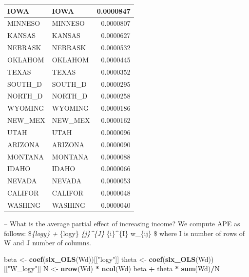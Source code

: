 \documentclass[
  a4paper,
]{article}
\newenvironment{Shaded}{\begin{snugshade}}{\end{snugshade}}
\newcommand{\FunctionTok}[1]{\textcolor[rgb]{0.13,0.29,0.53}{\textbf{#1}}}
\newcommand{\NormalTok}[1]{#1}
\newcommand{\OtherTok}[1]{\textcolor[rgb]{0.56,0.35,0.01}{#1}}
\newcommand{\SpecialCharTok}[1]{\textcolor[rgb]{0.81,0.36,0.00}{\textbf{#1}}}
\newcommand{\StringTok}[1]{\textcolor[rgb]{0.31,0.60,0.02}{#1}}
\begin{document}
\begin{table}
\begin{tabular}[t]{l|l|r}
\hline
IOWA & IOWA & 0.0000847\\
\hline
MINNESO & MINNESO & 0.0000807\\
\hline
KANSAS & KANSAS & 0.0000627\\
\hline
NEBRASK & NEBRASK & 0.0000532\\
\hline
OKLAHOM & OKLAHOM & 0.0000445\\
\hline
TEXAS & TEXAS & 0.0000352\\
\hline
SOUTH\_D & SOUTH\_D & 0.0000295\\
\hline
NORTH\_D & NORTH\_D & 0.0000258\\
\hline
WYOMING & WYOMING & 0.0000186\\
\hline
NEW\_MEX & NEW\_MEX & 0.0000162\\
\hline
UTAH & UTAH & 0.0000096\\
\hline
ARIZONA & ARIZONA & 0.0000090\\
\hline
MONTANA & MONTANA & 0.0000088\\
\hline
IDAHO & IDAHO & 0.0000066\\
\hline
NEVADA & NEVADA & 0.0000053\\
\hline
CALIFOR & CALIFOR & 0.0000048\\
\hline
WASHING & WASHING & 0.0000040\\
\hline
\end{tabular}
\end{table}

-- What is the average partial effect of increasing income? We compute
APE as follows: \$\beta\emph{\{logy\} + \theta}\{logy\} 
\sum\emph{\{j\}\^{}\{J\} \sum}\{i\}\^{}\{I\} w\_\{ij\} \$ where I is
number of rows of W and J number of columns.

\begin{Shaded}
\begin{Highlighting}[]
\NormalTok{beta }\OtherTok{\textless{}{-}} \FunctionTok{coef}\NormalTok{(}\FunctionTok{slx\_OLS}\NormalTok{(Wd))[[}\StringTok{"logy"}\NormalTok{]]}
\NormalTok{theta }\OtherTok{\textless{}{-}} \FunctionTok{coef}\NormalTok{(}\FunctionTok{slx\_OLS}\NormalTok{(Wd))[[}\StringTok{"W\_logy"}\NormalTok{]]}
\NormalTok{N }\OtherTok{\textless{}{-}} \FunctionTok{nrow}\NormalTok{(Wd) }\SpecialCharTok{*} \FunctionTok{ncol}\NormalTok{(Wd)}
\NormalTok{beta }\SpecialCharTok{+}\NormalTok{ theta }\SpecialCharTok{*} \FunctionTok{sum}\NormalTok{(Wd)}\SpecialCharTok{/}\NormalTok{N}
\end{Highlighting}
\end{Shaded}
\end{document}

